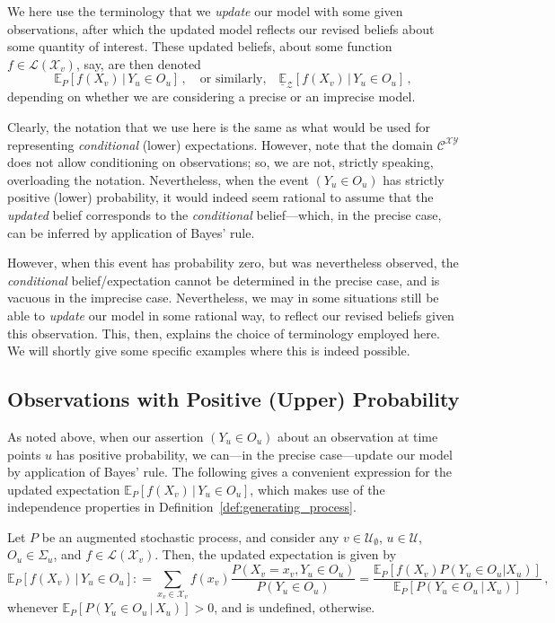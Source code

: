 \documentclass[twoside,11pt]{article}
\newcommand{\states}{\mathcal{X}}
\newcommand{\observs}{\mathcal{Y}}
\newcommand{\gambles}{\mathcal{L}}
\newcommand{\coloneqq}{:\!=}
\begin{document}
We here use the terminology that we \emph{update} our model with some given observations, after which the updated model reflects our revised beliefs about some quantity of interest. These updated beliefs, about some function $f\in\gambles(\states_v)$, say, are then denoted
\begin{equation*}
\mathbb{E}_P[f(X_v)\,\vert\,Y_u\in O_u]\,,\quad\text{or similarly,}\quad\underline{\mathbb{E}}_\mathcal{Z}[f(X_v)\,\vert\,Y_u\in O_u]\,,
\end{equation*}
depending on whether we are considering a precise or an imprecise model.

Clearly, the notation that we use here is the same as what would be used for representing \emph{conditional} (lower) expectations. However, note that the domain $\mathcal{C}^{\states\observs}$ does not allow conditioning on observations; so, we are not, strictly speaking, overloading the notation. Nevertheless, when the event $(Y_u\in O_u)$ has strictly positive (lower) probability, it would indeed seem rational to assume that the \emph{updated} belief corresponds to the \emph{conditional} belief---which, in the precise case, can be inferred by application of Bayes' rule. 

However, when this event has probability zero, but was nevertheless observed, the \emph{conditional} belief/expectation cannot be determined in the precise case, and is vacuous in the imprecise case. Nevertheless, we may in some situations still be able to \emph{update} our model in some rational way, to reflect our revised beliefs given this observation. This, then, explains the choice of terminology employed here. We will shortly give some specific examples where this is indeed possible.

\subsection{Observations with Positive (Upper) Probability}

As noted above, when our assertion $(Y_u\in O_u)$ about an observation at time points $u$ has positive probability, we can---in the precise case---update our model by application of Bayes' rule. The following gives a convenient expression for the updated expectation $\mathbb{E}_P[f(X_v)\,\vert\,Y_u\in O_u]$, which makes use of the independence properties in Definition~\ref{def:generating_process}.

\begin{proposition}\label{prop:precise_conditioning_for_positive}
Let $P$ be an augmented stochastic process, and consider any $v\in\mathcal{U}_\emptyset$, $u\in\mathcal{U}$, $O_u\in\Sigma_u$, and $f\in\gambles(\states_v)$. Then, the updated expectation is given by
\begin{equation*}
\mathbb{E}_P[f(X_v)\,\vert\,Y_u\in O_u] \coloneqq \sum_{x_v\in\states_v}f(x_v)\frac{P(X_v=x_v, Y_u\in O_u)}{P(Y_u\in O_u)} = \frac{\mathbb{E}_P[f(X_v)P(Y_u\in O_u\vert X_u)]}{\mathbb{E}_P[P(Y_u\in O_u\,\vert\,X_u)]}\,,
\end{equation*}
whenever $\mathbb{E}_P[P(Y_u\in O_u\,\vert\,X_u)]>0$, and is undefined, otherwise.
\end{proposition}
\end{document}
